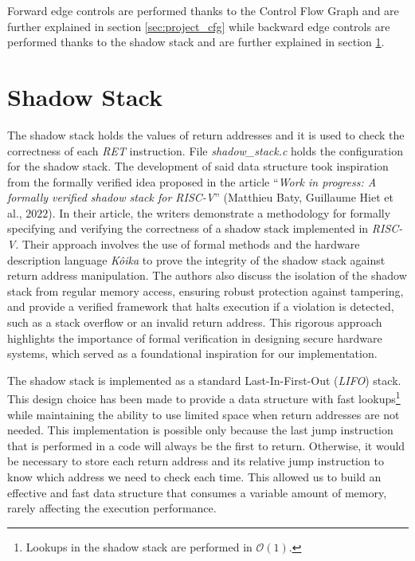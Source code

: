 Forward edge controls are performed thanks to the Control Flow Graph and are
further explained in section \ref{sec:project_cfg} while backward edge controls
are performed thanks to the shadow stack and are further explained in section
\ref{sec:project_ss}.

\section{Shadow Stack}
\label{sec:project_ss}

The shadow stack holds the values of return addresses and it is used to check the
correctness of each \textit{RET} instruction. File \textit{shadow\_stack.c}
holds the configuration for the shadow stack. The development of said data structure
took inspiration from the formally verified idea proposed in the article ``\textit{Work
in progress: A formally verified shadow stack for RISC-V}'' (Matthieu Baty,
Guillaume Hiet et al., $2022$)\cite{shadowstack}. In their article, the writers
demonstrate a methodology for formally specifying and verifying the correctness
of a shadow stack implemented in \textit{RISC-V}. Their approach involves the
use of formal methods and the hardware description language \textit{Kôika}\cite{koika}
to prove the integrity of the shadow stack against return address manipulation. The
authors also discuss the isolation of the shadow stack from regular memory access,
ensuring robust protection against tampering, and provide a verified framework that
halts execution if a violation is detected, such as a stack overflow or an
invalid return address. This rigorous approach highlights the importance of formal
verification in designing secure hardware systems, which served as a
foundational inspiration for our implementation.

The shadow stack is implemented as a standard Last-In-First-Out (\textit{LIFO}) stack.
This design choice has been made to provide a data structure with fast lookups\footnote{Lookups
in the shadow stack are performed in $\mathcal{O}(1)$.} while maintaining the ability
to use limited space when return addresses are not needed. This implementation
is possible only because the last jump instruction that is performed in a code
will always be the first to return. Otherwise, it would be necessary to store
each return address and its relative jump instruction to know which address we
need to check each time. This allowed us to build an effective and fast data structure
that consumes a variable amount of memory, rarely affecting the execution
performance.

